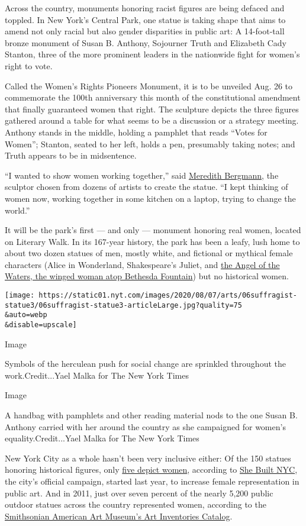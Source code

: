 Across the country, monuments honoring racist figures are being defaced
and toppled. In New York's Central Park, one statue is taking shape that
aims to amend not only racial but also gender disparities in public art:
A 14-foot-tall bronze monument of Susan B. Anthony, Sojourner Truth and
Elizabeth Cady Stanton, three of the more prominent leaders in the
nationwide fight for women's right to vote.

Called the Women's Rights Pioneers Monument, it is to be unveiled Aug.
26 to commemorate the 100th anniversary this month of the constitutional
amendment that finally guaranteed women that right. The sculpture
depicts the three figures gathered around a table for what seems to be a
discussion or a strategy meeting. Anthony stands in the middle, holding
a pamphlet that reads ``Votes for Women''; Stanton, seated to her left,
holds a pen, presumably taking notes; and Truth appears to be in
midsentence.

``I wanted to show women working together,'' said
\href{https://monumentalwomen.org/sculptors-page/}{Meredith Bergmann},
the sculptor chosen from dozens of artists to create the statue. ``I
kept thinking of women now, working together in some kitchen on a
laptop, trying to change the world.''

It will be the park's first --- and only --- monument honoring real
women, located on Literary Walk. In its 167-year history, the park has
been a leafy, lush home to about two dozen statues of men, mostly white,
and fictional or mythical female characters (Alice in Wonderland,
Shakespeare's Juliet, and
\href{https://www.nytimes.com/2019/05/29/obituaries/emma-stebbins-overlooked.html}{the
Angel of the Waters, the winged woman atop Bethesda Fountain}) but no
historical women.

\texttt{[image: https://static01.nyt.com/images/2020/08/07/arts/06suffragist-statue3/06suffragist-statue3-articleLarge.jpg?quality=75\\\&auto=webp\\\&disable=upscale]}

Image

Symbols of the herculean push for social change are sprinkled throughout
the work.Credit...Yael Malka for The New York Times

Image

A handbag with pamphlets and other reading material nods to the one
Susan B. Anthony carried with her around the country as she campaigned
for women's equality.Credit...Yael Malka for The New York Times

New York City as a whole hasn't been very inclusive either: Of the 150
statues honoring historical figures, only
\href{https://www.nytimes.com/2019/03/06/nyregion/women-statues-nyc.html}{five
depict women}, according to \href{https://women.nyc/she-built-nyc/}{She
Built NYC}, the city's official campaign, started last year, to increase
female representation in public art. And in 2011, just over seven
percent of the nearly 5,200 public outdoor statues across the country
represented women, according to the
\href{https://americanart.si.edu/research/inventories}{Smithsonian
American Art Museum's Art Inventories Catalog}.

